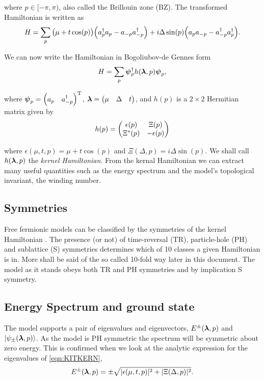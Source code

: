 \noi where $p\in[-\pi,\pi)$, also called the Brillouin zone (BZ). The transformed Hamiltonian is written as
\begin{equation}
    H = \sum_{p} \big(\mu + t\cos(p)\big)\Big(a_{p}^{\dagger}a_{p} -a_{-p}a_{-p}^{\dagger}\Big) + i\Delta\sin(p)\Big(a_{p}a_{-p} - a_{-p}^{\dagger}a_{p}^{\dagger}\Big).
\end{equation}

We can now write the Hamiltonian in Bogoliubov-de Gennes form 
\begin{equation}
    H = \sum_{p}\boldsymbol{\psi}_{p}^{\dagger}h(\boldsymbol{\lambda},p)\boldsymbol{\psi}_{p},
\end{equation}

\noi where $\boldsymbol{\psi}_{p}=\begin{pmatrix} a_{p} & a_{-p}^{\dagger}  \end{pmatrix} ^{\text{T}}$, $\boldsymbol{\lambda}=\begin{pmatrix} \mu & \Delta & t \end{pmatrix}$, and $h(p)$ is a $2\times2$ Hermitian matrix given by
\begin{equation}\label{eqn:KITKERN}
    h(p) = \begin{pmatrix} \epsilon(p) & \Xi(p) \\ \Xi^{*}(p) & -\epsilon(p) \end{pmatrix}
\end{equation}

\noi where $\epsilon(\mu,t,p)=\mu+t\cos(p)$ and $\Xi(\Delta,p)=i\Delta\sin(p)$. We shall call $h(\boldsymbol{\lambda},p)$ the \emph{kernel Hamiltonian}. From the kernal Hamiltonian we can extract many useful quantities such as the energy spectrum and the model's topological invariant, the winding number.

\subsection{Symmetries}

Free fermionic models can be classified by the symmetries of the kernel Hamiltonian \cite{Ryu10,Wen12,Schnyder08}. The presence (or not) of time-reversal (TR), particle-hole (PH) and sublattice (S) symmetries determines which of 10 classes a given Hamiltonian is in. More shall be said of the so called 10-fold way later in this document. The model as it stands obeys both TR and PH symmetries and by implication S symmetry.  

\subsection{Energy Spectrum and ground state}

The model supports a pair of eigenvalues and eigenvectors, $E^{\pm}(\boldsymbol{\lambda},p)$ and $\ket{\psi_{\pm}(\boldsymbol{\lambda},p)}$. As the model is PH symmetric the spectrum will be symmetric about zero energy. This is confirmed when we look at the analytic expression for the eigenvalues of \eqref{eqn:KITKERN}, 
\begin{equation}
    E^{\pm}(\boldsymbol{\lambda},p)=\pm\sqrt{|\epsilon(\mu,t,p)|^{2} + |\Xi(\Delta,p)|^{2}}.
\end{equation}

